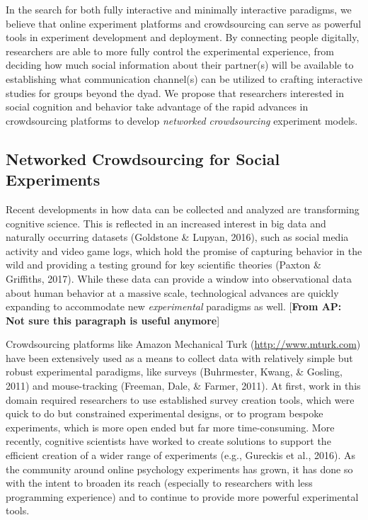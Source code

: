 \documentclass[10pt, letterpaper]{article}
\begin{document}
In the search for both fully interactive and minimally interactive
paradigms, we believe that online experiment platforms and crowdsourcing
can serve as powerful tools in experiment development and deployment. By
connecting people digitally, researchers are able to more fully control
the experimental experience, from deciding how much social information
about their partner(s) will be available to establishing what
communication channel(s) can be utilized to crafting interactive studies
for groups beyond the dyad. We propose that researchers interested in
social cognition and behavior take advantage of the rapid advances in
crowdsourcing platforms to develop \emph{networked crowdsourcing}
experiment models.

\subsection{Networked Crowdsourcing for Social
Experiments}\label{networked-crowdsourcing-for-social-experiments}

Recent developments in how data can be collected and analyzed are
transforming cognitive science. This is reflected in an increased
interest in big data and naturally occurring datasets (Goldstone \&
Lupyan, 2016), such as social media activity and video game logs, which
hold the promise of capturing behavior in the wild and providing a
testing ground for key scientific theories (Paxton \& Griffiths, 2017).
While these data can provide a window into observational data about
human behavior at a massive scale, technological advances are quickly
expanding to accommodate new \emph{experimental} paradigms as well.
{[}\textbf{From AP: Not sure this paragraph is useful anymore}{]}

Crowdsourcing platforms like Amazon Mechanical Turk
(\url{http://www.mturk.com}) have been extensively used as a means to
collect data with relatively simple but robust experimental paradigms,
like surveys (Buhrmester, Kwang, \& Gosling, 2011) and mouse-tracking
(Freeman, Dale, \& Farmer, 2011). At first, work in this domain required
researchers to use established survey creation tools, which were quick
to do but constrained experimental designs, or to program bespoke
experiments, which is more open ended but far more time-consuming. More
recently, cognitive scientists have worked to create solutions to
support the efficient creation of a wider range of experiments (e.g.,
Gureckis et al., 2016). As the community around online psychology
experiments has grown, it has done so with the intent to broaden its
reach (especially to researchers with less programming experience) and
to continue to provide more powerful experimental tools.
\end{document}
